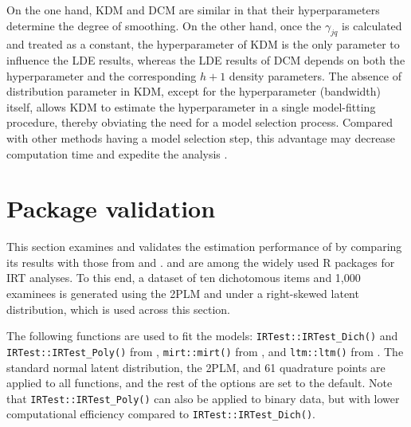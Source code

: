 On the one hand, KDM and DCM are similar in that their
hyperparameters determine the degree of smoothing. On the other hand,
once the \(\gamma_{jq}\) is calculated and treated as a constant, the
hyperparameter of KDM is the only parameter to influence the LDE results,
whereas the LDE results of DCM depends on both the hyperparameter and
the corresponding \(h+1\) density parameters. The absence of distribution
parameter in KDM, except for the hyperparameter (bandwidth) itself,
allows KDM to estimate the hyperparameter in a single
model-fitting procedure, thereby obviating the need for a model
selection process. Compared with other methods having a model selection
step, this advantage may decrease computation time and expedite the
analysis \citep{Li:2022}.

\hypertarget{package-validation}{%
\section{Package validation}\label{package-validation}}

This section examines and validates the estimation performance of
 by comparing its results with those from
 \citep{mirt} and  \citep{ltm}.  and
 are among the widely used R packages for IRT analyses. To this end,
a dataset of ten dichotomous items and 1,000 examinees is
generated using the 2PLM and under a right-skewed latent distribution,
which is used across this section.

The following functions are used to fit the models: \texttt{IRTest::IRTest\_Dich()} and
\texttt{IRTest::IRTest\_Poly()} from , \texttt{mirt::mirt()} from , and
\texttt{ltm::ltm()} from . The standard normal latent distribution, the 2PLM, and
61 quadrature points are applied to all functions, and the rest of the
options are set to the default. Note that \texttt{IRTest::IRTest\_Poly()} can also be
applied to binary data, but with lower computational efficiency compared to
\texttt{IRTest::IRTest\_Dich()}.

